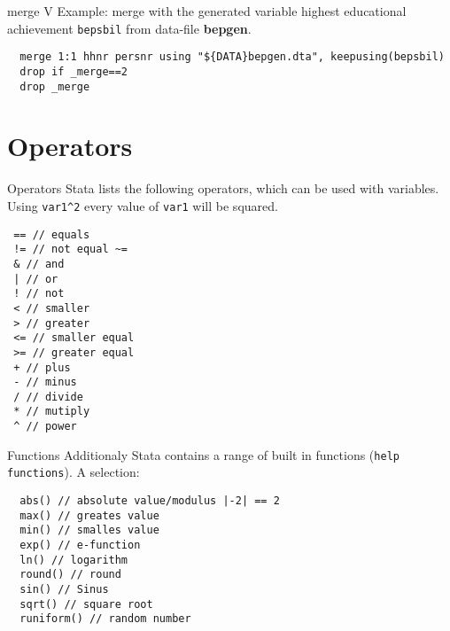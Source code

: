 \begin{frame}[fragile]{merge V}  
Example: merge with the generated variable highest educational achievement \texttt{bepsbil} from data-file \textbf{bepgen}.

\begin{lstlisting}
  merge 1:1 hhnr persnr using "${DATA}bepgen.dta", keepusing(bepsbil)
  drop if _merge==2
  drop _merge
\end{lstlisting}

\end{frame}

\section{Operators}
\begin{frame}[fragile]{Operators} 
Stata lists the following operators, which can be used with variables. Using \texttt{var1\^{}2} every value of \texttt{var1} will be squared.
\begin{lstlisting}
 == // equals
 != // not equal ~=
 & // and
 | // or
 ! // not
 < // smaller
 > // greater
 <= // smaller equal
 >= // greater equal
 + // plus
 - // minus
 / // divide
 * // mutiply
 ^ // power
\end{lstlisting}
\end{frame}

\begin{frame}[fragile]{Functions} 
Additionaly Stata contains a range of built in functions (\texttt{help functions}).
A selection:
\begin{lstlisting}
  abs() // absolute value/modulus |-2| == 2
  max() // greates value
  min() // smalles value
  exp() // e-function
  ln() // logarithm
  round() // round
  sin() // Sinus
  sqrt() // square root
  runiform() // random number
\end{lstlisting}
\end{frame}